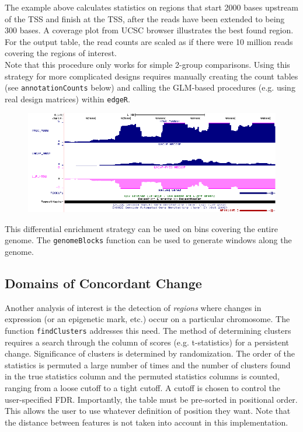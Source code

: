 \documentclass[a4paper, 12pt]{article}
\begin{document}
\noindent The example above calculates statistics on regions that start 2000 bases upstream of the TSS and finish at the TSS, after the reads have been extended to being 300 bases. A coverage plot from UCSC browser illustrates the best found region.  For the output table, the read counts are scaled as if there were 10 million reads covering the regions of interest. \\

\noindent Note that this procedure only works for simple 2-group comparisons.  Using this strategy for more complicated designs requires manually creating the count tables (see \texttt{annotationCounts} below) and calling the GLM-based procedures (e.g. using real design matrices) within \texttt{edgeR}. \\


\begin{figure}[!h]
    \begin{center}
        \includegraphics{rock1.png}
    \end{center}
\end{figure}

This differential enrichment strategy can be used on bins covering the entire genome.  The \texttt{genomeBlocks} function can be used to generate windows along the genome.


\subsection{Domains of Concordant Change}

Another analysis of interest is the detection of {\em regions} where changes in expression (or an epigenetic mark, etc.) occur on a particular chromosome. The function \texttt{findClusters} addresses this need. The method of determining clusters requires a search through the column of scores (e.g. t-statistics) for a persistent change.  Significance of clusters is determined by randomization.  The order of the statistics is permuted a large number of times and the number of clusters found in the true statistics column and the permuted statistics columns is counted, ranging from a loose cutoff to a tight cutoff.  A cutoff is chosen to control the user-specified FDR. Importantly, the table must be pre-sorted in positional order. This allows the user to use whatever definition of position they want.  Note that the distance between features is not taken into account in this implementation.
\end{document}
